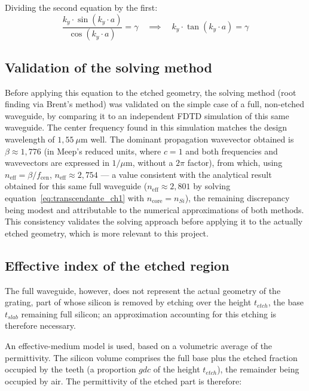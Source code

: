 \documentclass[a4paper,11pt]{report}
\begin{document}
Dividing the second equation by the first:
\begin{equation}
\frac{k_y \cdot \sin(k_y \cdot a)}{\cos(k_y \cdot a)} = \gamma \quad \implies \quad k_y \cdot \tan(k_y \cdot a) = \gamma
\label{eq:transcendante_ch1}
\end{equation}

\subsection*{Validation of the solving method}

Before applying this equation to the etched geometry, the solving method (root finding via Brent's method) was validated on the simple case of a full, non-etched waveguide, by comparing it to an independent FDTD simulation of this same waveguide. The center frequency found in this simulation matches the design wavelength of $1{,}55~\mu\text{m}$ well. The dominant propagation wavevector obtained is $\beta \approx 1{,}776$ (in Meep's reduced units, where $c=1$ and both frequencies and wavevectors are expressed in $1/\mu\text{m}$, without a $2\pi$ factor), from which, using $n_{\text{eff}} = \beta/f_{\text{cen}}$, $n_{\text{eff}} \approx 2{,}754$ --- a value consistent with the analytical result obtained for this same full waveguide ($n_{\text{eff}}\approx2{,}801$ by solving equation~\eqref{eq:transcendante_ch1} with $n_{\text{core}}=n_{Si}$), the remaining discrepancy being modest and attributable to the numerical approximations of both methods. This consistency validates the solving approach before applying it to the actually etched geometry, which is more relevant to this project.

\subsection*{Effective index of the etched region}

The full waveguide, however, does not represent the actual geometry of the grating, part of whose silicon is removed by etching over the height $t_{etch}$, the base $t_{slab}$ remaining full silicon; an approximation accounting for this etching is therefore necessary.

An effective-medium model is used, based on a volumetric average of the permittivity. The silicon volume comprises the full base plus the etched fraction occupied by the teeth (a proportion $gdc$ of the height $t_{etch}$), the remainder being occupied by air. The permittivity of the etched part is therefore:
\end{document}
